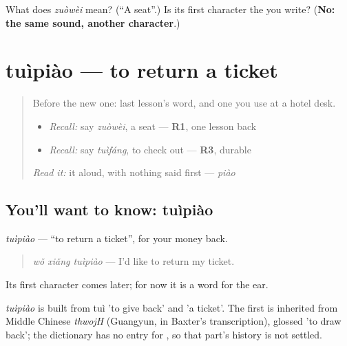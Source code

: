 \begin{tcolorbox}[breakable,colback=teal!4,colframe=teal!35!black,title={Before you move on}]
What does \emph{zuòwèi} mean? (\textquotedblleft{}A seat\textquotedblright{}.) Is its first character the  you write? (\textbf{No: the same sound, another character}.)
\end{tcolorbox}
\section[tuìpiào]{tuìpiào — to return a ticket}

\label{lesson:ZH-C284-tuipiao}



\begin{quote}
Before the new one: last lesson's word, and one you use at a hotel desk.

\begin{itemize}
\raggedright
  \item \emph{Recall:} say \emph{zuòwèi}, a seat — \textbf{R1}, one lesson back
  \item \emph{Recall:} say \emph{tuìfáng}, to check out — \textbf{R3}, durable
\end{itemize}

\begin{quote}
\end{quote}

\emph{Read it:} it aloud, with nothing said first — \emph{piào}
\end{quote}

\subsection*{You'll want to know: tuìpiào}
\emph{tuìpiào} — \textquotedblleft{}to return a ticket\textquotedblright{}, for your money back.

\begin{quote}
\emph{wǒ xiǎng tuìpiào} — I'd like to return my ticket.
\end{quote}

Its first character comes later; for now it is a word for the ear.

\begin{cousinweb}
\emph{tuìpiào} is built from tuì 'to give back' and  'a ticket'. The first is inherited from Middle Chinese \emph{thwojH} (Guangyun, in Baxter's transcription), glossed 'to draw back'; the dictionary has no entry for , so that part's history is not settled.
\end{cousinweb}

